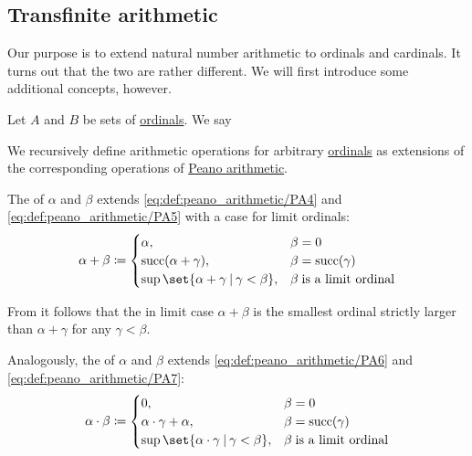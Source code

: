 \subsection{Transfinite arithmetic}\label{subsec:ordinal_and_cardinal_arithmetic}

Our purpose is to extend natural number arithmetic to ordinals and cardinals. It turns out that the two are rather different. We will first introduce some additional concepts, however.

\begin{definition}
  Let \( A \) and \( B \) be sets of \hyperref[def:ordinal]{ordinals}. We say
\end{definition}

\begin{definition}\label{def:ordinal_arithmetic}
  We recursively define arithmetic operations for arbitrary \hyperref[def:ordinal]{ordinals} as extensions of the corresponding operations of \hyperref[def:peano_arithmetic]{Peano arithmetic}.

  \begin{thmenum}
     The  of \( \alpha \) and \( \beta \) extends \eqref{eq:def:peano_arithmetic/PA4} and \eqref{eq:def:peano_arithmetic/PA5} with a case for limit ordinals:
    \begin{equation}\label{eq:def:ordinal_arithmetic/sum}
      \alpha + \beta \coloneqq \begin{cases}
        \alpha,                                            &\beta = 0 \\
        \op{succ}(\alpha + \gamma),                        &\beta = \op{succ}(\gamma) \\
        \sup\set{ \alpha + \gamma \given \gamma < \beta }, &\beta \T{is a limit ordinal} \\
      \end{cases}
    \end{equation}

    From  it follows that the in limit case \( \alpha + \beta \) is the smallest ordinal strictly larger than \( \alpha + \gamma \) for any \( \gamma < \beta \).

     Analogously, the  of \( \alpha \) and \( \beta \) extends \eqref{eq:def:peano_arithmetic/PA6} and \eqref{eq:def:peano_arithmetic/PA7}:
    \begin{equation}\label{eq:def:ordinal_arithmetic/product}
      \alpha \cdot \beta \coloneqq \begin{cases}
        0,                                                     &\beta = 0 \\
        \alpha \cdot \gamma + \alpha,                          &\beta = \op{succ}(\gamma) \\
        \sup\set{ \alpha \cdot \gamma \given \gamma < \beta }, &\beta \T{is a limit ordinal} \\
      \end{cases}
    \end{equation}


\end{thmenum}
\end{definition}
